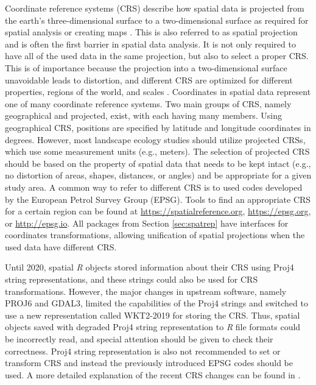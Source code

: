 \documentclass[smallextended]{svjour3}       %
\begin{document}
Coordinate reference systems (CRS) describe how spatial data is projected from the earth's three-dimensional surface to a two-dimensional surface as required for spatial analysis or creating maps \cite{Lovelace2019,Pebesma2019a}.
This is also referred to as spatial projection and is often the first barrier in spatial data analysis.
It is not only required to have all of the used data in the same projection, but also to select a proper CRS.
This is of importance because the projection into a two-dimensional surface unavoidable leads to distortion, and different CRS are optimized for different properties, regions of the world, and scales \cite{Bivand2013,Lovelace2019}.
Coordinates in spatial data represent one of many coordinate reference systems.
Two main groups of CRS, namely geographical and projected, exist, with each having many members.
Using geographical CRS, positions are specified by latitude and longitude coordinates in degrees.
However, most landscape ecology studies should utilize projected CRSs, which use some measurement units (e.g., meters).
The selection of projected CRS should be based on the property of spatial data that needs to be kept intact (e.g., no distortion of areas, shapes, distances, or angles) and be appropriate for a given study area.
A common way to refer to different CRS is to used codes developed by the European Petrol Survey Group (EPSG).
Tools to find an appropriate CRS for a certain region can be found at \url{https://spatialreference.org}, \url{https://epsg.org}, or \url{http://epsg.io}.
All packages from Section \ref{sec:spatrep} have interfaces for coordinates transformations, allowing unification of spatial projections when the used data have different CRS.

Until 2020, spatial \textit{R} objects stored information about their CRS using Proj4 string representations, and these strings could also be used for CRS transformations.
However, the major changes in upstream software, namely PROJ6 and GDAL3, limited the capabilities of the Proj4 strings and switched to use a new representation called WKT2-2019 for storing the CRS.
Thus, spatial objects saved with degraded Proj4 string representation to \textit{R} file formats could be incorrectly read, and special attention should be given to check their correctness.
Proj4 string representation is also not recommended to set or transform CRS and instead the previously introduced EPSG codes should be used.
A more detailed explanation of the recent CRS changes can be found in \cite{Bivand2020}.
\end{document}
